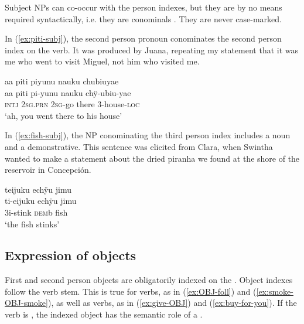 
Subject NPs can co-occur with the person indexes, but they are by no means required syntactically, i.e. they are conominals \citep[cf.][217]{Haspelmath2013}. They are never case-marked.

In (\ref{ex:piti-subj}), the second person pronoun conominates the second person index on the verb. It was produced by Juana, repeating my statement that it was me who went to visit Miguel, not him who visited me.

\ea\label{ex:piti-subj}
\begingl
\glpreamble aa piti piyunu nauku chubiuyae\\
\gla aa piti pi-yunu nauku chÿ-ubiu-yae\\
\glb \textsc{intj} 2\textsc{sg.prn} 2\textsc{sg}-go there 3-house-\textsc{loc}\\
\glft ‘ah, you went there to his house’
\endgl
\trailingcitation{[jxx-e110923l-1.028]}
\xe

In (\ref{ex:fish-subj}), the NP conominating the third person index includes a noun and a demonstrative. This sentence was elicited from Clara, when Swintha wanted to make a statement about the dried piranha we found at the shore of the reservoir in Concepción.

\ea\label{ex:fish-subj}
\begingl
\glpreamble teijuku echÿu jimu\\
\gla ti-eijuku echÿu jimu\\
\glb 3i-stink \textsc{dem}b fish\\
\glft ‘the fish stinks’
\endgl
\trailingcitation{[cux-c120414ls-2.111]}
\xe


\subsection{Expression of objects}\label{sec:ExpressionObjects}

First and second person objects are obligatorily indexed on the . Object indexes follow the verb stem. This is true for  verbs, as in (\ref{ex:OBJ-foll}) and (\ref{ex:smoke-OBJ-smoke}), as well as  verbs, as in (\ref{ex:give-OBJ}) and (\ref{ex:buy-for-you}). If the verb is , the indexed object has the semantic role of a .

